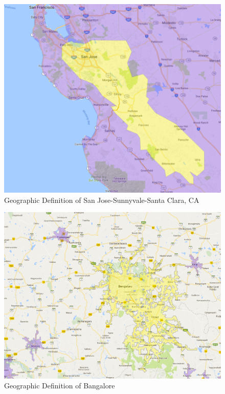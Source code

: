 \documentclass[12pt]{article}
\begin{document}
\singlespacing
 



\appendix
\begin{figure}[h]
\begin{centering}
  \includegraphics[width=\textwidth]{SanJose}
  \caption{Geographic Definition of San Jose-Sunnyvale-Santa Clara, CA}
   \label{fig:SanJose}
\end{centering}
\end{figure}


\begin{figure}[h]
\begin{centering}
  \includegraphics[width=\textwidth]{Bangalore}
  \caption{Geographic Definition of Bangalore}
   \label{fig:Bangalore}
\end{centering}
\end{figure}
\end{document}
